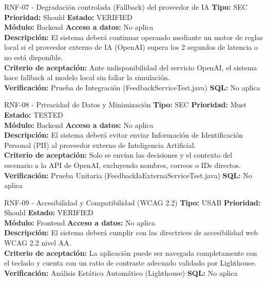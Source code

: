 \documentclass[11pt,a4paper]{article}
\begin{document}
\begin{requisito}{RNF-07 - Degradación controlada (Fallback) del proveedor de IA}
    \textbf{Tipo:} SEC \quad \textbf{Prioridad:} Should \quad \textbf{Estado:} VERIFIED \\[0.2cm]
    \textbf{Módulo:} Backend \quad \textbf{Acceso a datos:} No aplica \\[0.2cm]
    \textbf{Descripción:} El sistema deberá continuar operando mediante un motor de reglas local si el proveedor externo de IA (OpenAI) supera los 2 segundos de latencia o no está disponible. \\[0.2cm]
    \textbf{Criterio de aceptación:} Ante indisponibilidad del servicio OpenAI, el sistema hace fallback al modelo local sin fallar la simulación. \\[0.2cm]
    \textbf{Verificación:} Prueba de Integración (FeedbackServiceTest.java) \quad \textbf{SQL:} No aplica
\end{requisito}

\begin{requisito}{RNF-08 - Privacidad de Datos y Minimización}
    \textbf{Tipo:} SEC \quad \textbf{Prioridad:} Must \quad \textbf{Estado:} TESTED \\[0.2cm]
    \textbf{Módulo:} Backend \quad \textbf{Acceso a datos:} No aplica \\[0.2cm]
    \textbf{Descripción:} El sistema deberá evitar enviar Información de Identificación Personal (PII) al proveedor externo de Inteligencia Artificial. \\[0.2cm]
    \textbf{Criterio de aceptación:} Solo se envían las decisiones y el contexto del escenario a la API de OpenAI, excluyendo nombres, correos o IDs directos. \\[0.2cm]
    \textbf{Verificación:} Prueba Unitaria (FeedbackIaExternaServiceTest.java) \quad \textbf{SQL:} No aplica
\end{requisito}

\begin{requisito}{RNF-09 - Accesibilidad y Compatibilidad (WCAG 2.2)}
    \textbf{Tipo:} USAB \quad \textbf{Prioridad:} Should \quad \textbf{Estado:} VERIFIED \\[0.2cm]
    \textbf{Módulo:} Frontend \quad \textbf{Acceso a datos:} No aplica \\[0.2cm]
    \textbf{Descripción:} El sistema deberá cumplir con las directrices de accesibilidad web WCAG 2.2 nivel AA. \\[0.2cm]
    \textbf{Criterio de aceptación:} La aplicación puede ser navegada completamente con el teclado y cuenta con un ratio de contraste adecuado validado por Lighthouse. \\[0.2cm]
    \textbf{Verificación:} Análisis Estático Automático (Lighthouse) \quad \textbf{SQL:} No aplica
\end{requisito}
\end{document}
